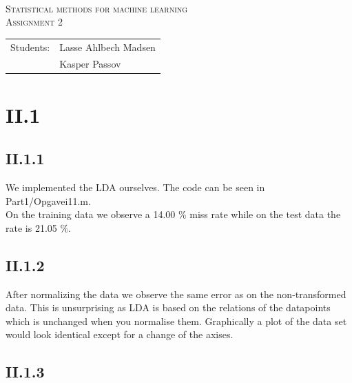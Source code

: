 \documentclass{article}
\begin{document}
\begin{titlepage}
\begin{center}
    \hline \\[0.2cm]
\textsc{\Large Statistical methods for machine learning}\\[0.5cm]
\textsc{\large Assignment 2}\\[0.5cm]
    \hline
    \hline
\vspace{2 cm}
\begin{tabular}{ll}
Students: & Lasse Ahlbech Madsen \\
          & Kasper Passov\\
\end{tabular}
\end{center}
\vspace{5 cm}
\newpage
\end{titlepage}

\section{II.1}

\subsection{II.1.1}

We implemented the LDA ourselves. The code can be seen in
Part1/Opgavei11.m. \\
On the training data we observe a 14.00 \% miss rate while on the test data
the rate is 21.05 \%.

\subsection{II.1.2}

After normalizing the data we observe the same error as on the
non-transformed data.  
This is unsurprising as LDA is based on the relations of the datapoints
which is unchanged when you normalise them. Graphically a plot of the data
set would look identical except for a change of the axises.

\subsection{II.1.3}
\end{document}
